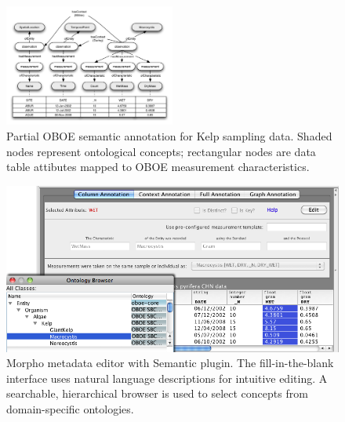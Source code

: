 

\begin{figure}[!b]
\centering
\includegraphics[width=0.5\textwidth]{images/kelp-mass-model.png}
\caption{Partial OBOE semantic annotation for Kelp sampling
  data. Shaded nodes represent ontological concepts; rectangular nodes
  are data table attibutes mapped to OBOE measurement
  characteristics.}
\label{fig:kelp-mass-model}
\end{figure}

\begin{figure}[!t]
\centering
\includegraphics[width=1.0\textwidth]{images/morpho-annotation-widget.png}
\caption{Morpho metadata editor with Semantic
  plugin. The fill-in-the-blank interface uses
  natural language descriptions for intuitive editing. A searchable, hierarchical browser is
  used to select concepts from domain-specific ontologies.}
\label{fig:morpho-annotation}
\end{figure}

